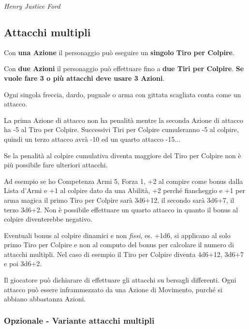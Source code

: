 \begin{multicols}{2}
\begin{center}
\emph{Henry Justice Ford}
\end{center}

\subsection{Attacchi multipli}\label{attacchimultiplimischia}\hypertarget{attacchimultiplimischia}{}

Con \textbf{una Azione} il personaggio può eseguire un \textbf{singolo Tiro per Colpire}.

Con \textbf{due Azioni} il personaggio può effettuare fino a \textbf{due Tiri per Colpire}. \textbf{Se vuole fare 3 o più attacchi deve usare 3 Azioni}.

Ogni singola freccia, dardo, pugnale o arma con gittata scagliata conta come un attacco.

La prima Azione di attacco non ha penalità mentre la seconda Azione di attacco ha -5 al Tiro per Colpire. Successivi Tiri per Colpire cumuleranno -5 al colpire, quindi un terzo attacco avrà -10 ed un quarto attacco -15...

Se la penalità al colpire cumulativa diventa maggiore del Tiro per Colpire non è più possibile fare ulteriori attacchi.

\begin{changemargin}{0.3cm}{0.3cm}\begin{tcolorbox}[title = Esempio Attacco Multiplo]
Ad esempio se ho Competenza Armi 5, Forza 1, +2 al compire come bonus dalla Lista d'Armi e +1 al colpire dato da una Abilità, +2 perché fiancheggio e +1 per arma magica il primo Tiro per Colpire sarà 3d6+12, il secondo sarà 3d6+7, il terzo 3d6+2. Non è possibile effettuare un quarto attacco in quanto il bonus al colpire diventerebbe negativo.
\end{tcolorbox}\end{changemargin}

Eventuali bonus al colpire dinamici e non \emph{fissi}, es. +1d6, si applicano al solo primo Tiro per Colpire e non al computo del bonus per calcolare il numero di attacchi multipli. Nel caso di esempio il Tiro per Colpire diventa 4d6+12, 3d6+7 e poi 3d6+2.

Il giocatore può dichiarare di effettuare gli attacchi su bersagli differenti. Ogni attacco può essere inframmezzato da una Azione di Movimento, purché si abbiano abbastanza Azioni.

\subsubsection{Opzionale - Variante attacchi multipli}\label{varianteattacchimultipli}\hypertarget{varianteattacchimultipli}{}


\end{multicols}

